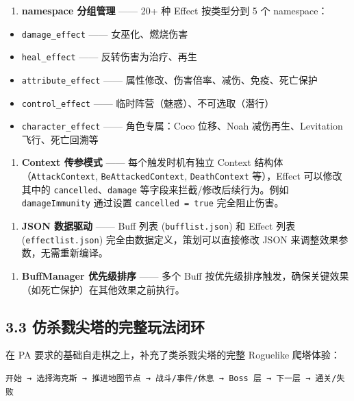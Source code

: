 \documentclass[UTF8,10pt]{ctexart}
\begin{document}
\begin{enumerate}
\item \textbf{namespace 分组管理} —— 20+ 种 Effect 按类型分到 5 个 namespace：
\end{enumerate}
\begin{itemize}
\item \texttt{damage\_\allowbreak{}effect} —— 女巫化、燃烧伤害
\item \texttt{heal\_\allowbreak{}effect} —— 反转伤害为治疗、再生
\item \texttt{attribute\_\allowbreak{}effect} —— 属性修改、伤害倍率、减伤、免疫、死亡保护
\item \texttt{control\_\allowbreak{}effect} —— 临时阵营（魅惑）、不可选取（潜行）
\item \texttt{character\_\allowbreak{}effect} —— 角色专属：Coco 位移、Noah 减伤再生、Levitation 飞行、死亡回溯等
\end{itemize}

\begin{enumerate}
\item \textbf{Context 传参模式} —— 每个触发时机有独立 Context 结构体（\texttt{AttackContext}, \texttt{BeAttackedContext}, \texttt{DeathContext} 等），Effect 可以修改其中的 \texttt{cancelled}、\texttt{damage} 等字段来拦截/修改后续行为。例如 \texttt{damageImmunity} 通过设置 \texttt{cancelled = true} 完全阻止伤害。
\end{enumerate}

\begin{enumerate}
\item \textbf{JSON 数据驱动} —— Buff 列表 (\texttt{bufflist.\allowbreak{}json}) 和 Effect 列表 (\texttt{effectlist.\allowbreak{}json}) 完全由数据定义，策划可以直接修改 JSON 来调整效果参数，无需重新编译。
\end{enumerate}

\begin{enumerate}
\item \textbf{BuffManager 优先级排序} —— 多个 Buff 按优先级排序触发，确保关键效果（如死亡保护）在其他效果之前执行。
\end{enumerate}

\subsection*{3.3 仿杀戮尖塔的完整玩法闭环}

在 PA 要求的基础自走棋之上，补充了类杀戮尖塔的完整 Roguelike 爬塔体验：

\begin{lstlisting}
开始 → 选择海克斯 → 推进地图节点 → 战斗/事件/休息 → Boss 层 → 下一层 → 通关/失败
\end{lstlisting}
\end{document}
